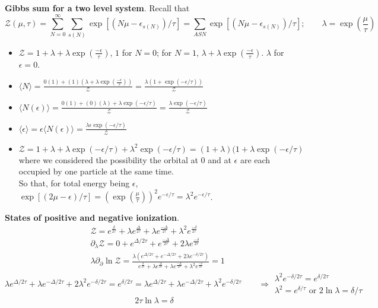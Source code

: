  \textbf{Gibbs sum for a two level system}.  
Recall that 
\[
\mathcal{Z}(\mu, \tau) = \sum_{N=0}^{\infty} \sum_{s(N)} \exp{ [ (N \mu - \epsilon_{s(N)} )/\tau ]} = \sum_{ASN} \exp{ [(N\mu - \epsilon_{s(N)})/\tau ]}; \quad \quad \lambda = \exp{ \left( \frac{\mu}{\tau} \right)}
\]
\begin{itemize}
\item[(a)] $\mathcal{Z} = 1 + \lambda + \lambda \exp{ \left( \frac{- \epsilon}{\tau} \right)}$,  $1$ for $N=0$; for $N=1$, $\lambda + \lambda \exp{ \left( \frac{-\epsilon}{\tau} \right)}$.  $\lambda$ for $\epsilon =0$.  
\item[(b)] $\langle N \rangle = \frac{ 0 (1) + (1) (\lambda + \lambda \exp{ \left( \frac{-\epsilon}{\tau} \right)} ) }{ \mathcal{Z}} = \frac{ \lambda ( 1 + \exp{ (-\epsilon/\tau )} ) }{ \mathcal{Z}}$
\item[(c)] $\langle N(\epsilon) \rangle = \frac{ 0 (1) + (0) (\lambda) + \lambda \exp{ (-\epsilon/\tau) }  }{ \mathcal{Z}} = \frac{ \lambda \exp{ (-\epsilon/\tau) } }{ \mathcal{Z}}$
\item[(d)]$\langle \epsilon \rangle = \epsilon \langle N(\epsilon) \rangle = \frac{ \lambda \epsilon \exp{ (-\epsilon/\tau)} }{\mathcal{Z}}$  
\item[(e)] 
\[
\mathcal{Z} = 1 + \lambda + \lambda \exp{ (-\epsilon/\tau) } + \lambda^2 \exp{ (-\epsilon/\tau) } = (1+ \lambda)(1 + \lambda \exp{ ( -\epsilon/\tau) }
\]
where we considered the possibility the orbital at $0$ and at $\epsilon$ are each occupied by one particle at the same time.  \\
So that, for total energy being $\epsilon$, $\exp{ [ (2\mu - \epsilon)/\tau ]}=   (\exp{ \left( \frac{\mu}{\tau} \right)})^2 e^{-\epsilon/\tau} = \lambda^2 e^{-\epsilon/\tau}$.  
\end{itemize}

 \textbf{States of positive and negative ionization}.  
\[
\begin{aligned}
  & \mathcal{Z} = e^{ \frac{ \delta}{2\tau} } + \lambda e^{\frac{ \Delta }{ 2 \tau }} + \lambda e^{\frac{ -\Delta }{ 2 \tau }}  + \lambda^2 e^{ \frac{ -\delta}{2\tau} } \\
  &  \partial_{\lambda} \mathcal{Z} = 0 + e^{ \Delta/ 2\tau } + e^{\frac{ -\Delta }{ 2 \tau }} + 2 \lambda e^{\frac{ -\delta }{ 2 \tau }} \\ 
  & \lambda \partial_{ \partial} \ln{ \mathcal{Z}} = \frac{ \lambda ( e^{ \Delta/ 2\tau} + e^{-\Delta/2\tau} + 2 \lambda e^{-\delta/ 2\tau} ) }{ e^{ \frac{ \delta}{2\tau} } + \lambda e^{\frac{ \Delta }{ 2 \tau }} + \lambda e^{\frac{ -\Delta }{ 2 \tau }}  + \lambda^2 e^{ \frac{ -\delta}{2\tau} } } = 1 
\end{aligned}
\]
\[
\lambda e^{\Delta/ 2\tau} + \lambda e^{-\Delta/2\tau} + 2\lambda^2 e^{-\delta/2\tau} = e^{\delta/2\tau} = \lambda e^{\Delta/2\tau} + \lambda e^{-\Delta/2\tau} + \lambda^2 e^{-\delta/2\tau} \quad \quad \Longrightarrow \begin{gathered} \lambda^2 e^{-\delta/2\tau} = e^{\delta/2\tau} \\ \lambda^2 = e^{\delta/\tau} \text{ or } 2 \ln{\lambda } = \delta/\tau \end{gathered} 
\]
\[
\boxed{ 2 \tau \ln{\lambda } = \delta }
\]

